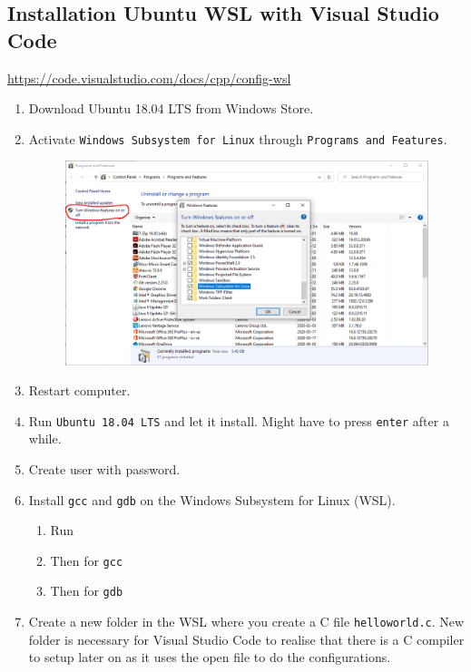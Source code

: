 \subsection{Installation Ubuntu WSL with Visual Studio Code}

\url{https://code.visualstudio.com/docs/cpp/config-wsl}

\begin{enumerate}
    \item Download Ubuntu 18.04 LTS from Windows Store.
    \item Activate \texttt{Windows Subsystem for Linux} through \texttt{Programs and Features}.
        \begin{figure}[H]
            \centering
            \includegraphics[width=\textwidth]{Figures/WSL/turn_on_WSL.PNG}
        \end{figure}
    \item Restart computer.
    \item Run \texttt{Ubuntu 18.04 LTS} and let it install. Might have to press \texttt{enter} after a while.
    \item Create user with password.
    \item Install \texttt{gcc} and \texttt{gdb} on the Windows Subsystem for Linux (WSL).
    \begin{enumerate}
        \item Run 
        \item Then  for \texttt{gcc}
        \item Then  for \texttt{gdb}
    \end{enumerate}
    \item Create a new folder in the WSL where you create a C file \texttt{helloworld.c}. New folder is necessary for Visual Studio Code to realise that there is a C compiler to setup later on as it uses the open file to do the configurations.

\end{enumerate}
